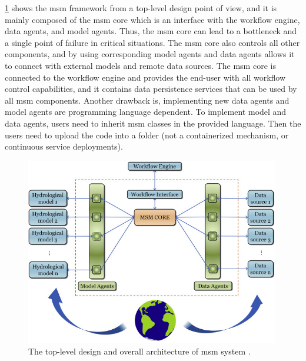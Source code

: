 \cref{fi:msm_architecture} shows the \acrshort{msm} framework from a top-level design point of view, and it is mainly composed of the \acrshort{msm} core which is an interface with the workflow engine, data agents, and model agents. Thus, the \acrshort{msm} core can lead to a bottleneck and a single point of failure in critical situations. The \acrshort{msm} core also controls all other components, and by using corresponding model agents and data agents allows it to connect with external models and remote data sources. The \acrshort{msm} core is connected to the workflow engine and provides the end-user with all workflow control capabilities, and it contains data persistence services that can be used by all \acrshort{msm} components. Another drawback is, implementing new data agents and model agents are programming language dependent. To implement model and data agents, users need to inherit \acrshort{msm} classes in the provided language. Then the users need to upload the code into a folder (not a containerized mechanism, or continuous service deployments).

\begin{figure}[htp]
    \centering
    \includegraphics[width=0.99\textwidth]{lit/other/msm_architecture.jpg}
    \caption[The top-level design and overall architecture of \acrshort{msm} system]{The top-level design and overall architecture of \acrshort{msm} system \cite{Salas2020AnApplication}.}
    \label{fi:msm_architecture}
\end{figure}

